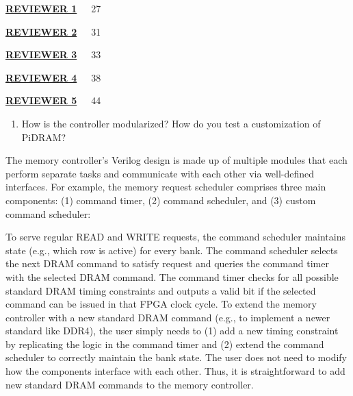 \noindent \textbf{\hyperlink{reviewer1}{REVIEWER 1}}~\mydots~~27
\vspace{5pt}

\noindent \textbf{\hyperlink{reviewer2}{REVIEWER 2}}~\mydots~~31
\vspace{5pt}

\noindent \textbf{\hyperlink{reviewer3}{REVIEWER 3}}~\mydots~~33
\vspace{5pt}

\noindent \textbf{\hyperlink{reviewer4}{REVIEWER 4}}~\mydots~~38
\vspace{5pt}

\noindent \textbf{\hyperlink{reviewer5}{REVIEWER 5}}~\mydots~~44
\vspace{5pt}

\newpage
\begin{center}
    {\Large {}}
\end{center}


\begin{tcolorbox}
    \begin{enumerate}[label=R1/\arabic*]
        \item \label{q:r1q1} How is the controller modularized? How do you test a customization of PiDRAM? 
    \end{enumerate}
\end{tcolorbox} 

The memory controller’s Verilog design is made up of multiple modules that each perform separate tasks and communicate with each other via well-defined interfaces. For example, the memory request scheduler comprises three main components: (1) command timer, (2) command scheduler, and (3) custom command scheduler:

To serve regular READ and WRITE requests, the command scheduler maintains state (e.g., which row is active) for every bank. The command scheduler selects the next DRAM command to satisfy    request and queries the command timer with the selected DRAM command. The command timer checks for all possible standard DRAM timing constraints and outputs a valid bit if the selected command can be issued in that FPGA clock cycle. To extend the memory controller with a new standard DRAM command (e.g., to implement a newer standard like DDR4), the user simply needs to (1) add a new timing constraint by replicating the logic in the command timer and (2) extend the command scheduler to correctly maintain the bank state. The user does not need to modify how the components interface with each other. Thus, it is straightforward to add new standard DRAM commands to the memory controller.

